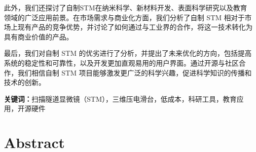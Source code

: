 \documentclass{article}
\begin{document}
此外，我们还探讨了自制STM在纳米科学、新材料开发、表面科学研究以及教育领域的广泛应用前景。在市场需求与商业化方面，我们分析了自制 STM 相对于市场上现有产品的竞争优势，并讨论了如何通过与工业界的合作，将这一技术转化为具有商业价值的产品。

最后，我们对自制 STM 的优劣进行了分析，并提出了未来优化的方向，包括提高系统的稳定性和可靠性，以及开发更加直观易用的用户界面。通过开源与社区合作，我们相信自制 STM 项目能够激发更广泛的科学兴趣，促进科学知识的传播和技术的创新。

\textbf{关键词：}扫描隧道显微镜（STM），三维压电滑台，低成本，科研工具，教育应用，开源硬件

\clearpage
\section*{\textbf{Abstract}} %
\end{document}
